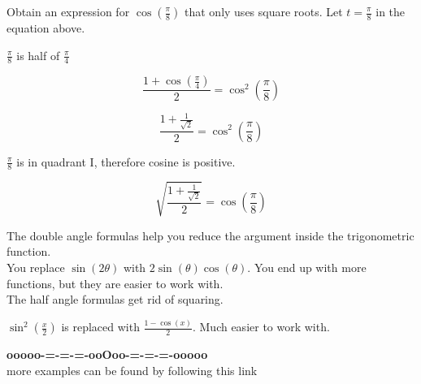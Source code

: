 \documentclass{ximera}
\begin{document}
\begin{example}

Obtain an expression for $\cos\left(  \frac{\pi}{8}  \right)$ that only uses square roots.
Let $t = \frac{\pi}{8}$ in the equation above.



\begin{explanation}

$\frac{\pi}{8}$ is half of $\frac{\pi}{4}$




\[   \frac{1 + \cos( \frac{\pi}{4} )}{2}  =   \cos^2\left( \frac{\pi}{8} \right)  \]


\[   \frac{1 + \frac{1}{\sqrt{2}}}{2}  =   \cos^2\left( \frac{\pi}{8} \right)  \]



$\frac{\pi}{8}$ is in quadrant I, therefore cosine is positive.




\[   \sqrt{ \frac{1 + \frac{1}{\sqrt{2}}}{2} }  =   \cos\left( \frac{\pi}{8} \right)  \]





\end{explanation}

\end{example}


The double angle formulas help you reduce the argument inside the trigonometric function. \\


You replace $\sin(2 \theta)$ with $2 \sin(\theta) \cos(\theta)$.  You end up with more functions, but they are easier to work with. \\


The half angle formulas get rid of squaring.


$\sin^2\left( \tfrac{x}{2} \right)$ is replaced with $\frac{1 - \cos(x)}{2}$.  Much easier to work with.















\begin{center}
\textbf{\textcolor{green!50!black}{ooooo-=-=-=-ooOoo-=-=-=-ooooo}} \\

more examples can be found by following this link\\ 

\end{center}
\end{document}
